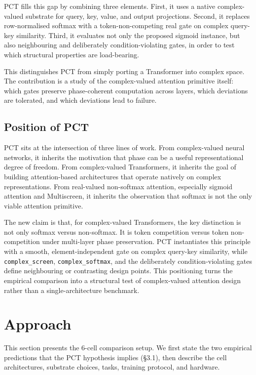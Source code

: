\documentclass[11pt,a4paper]{article}
\theoremstyle{plain}
\theoremstyle{definition}
\begin{document}
PCT fills this gap by combining three elements. First, it uses a native complex-valued substrate for query, key, value, and output projections. Second, it replaces row-normalised softmax with a token-non-competing real gate on complex query-key similarity. Third, it evaluates not only the proposed sigmoid instance, but also neighbouring and deliberately condition-violating gates, in order to test which structural properties are load-bearing.

This distinguishes PCT from simply porting a Transformer into complex space. The contribution is a study of the complex-valued attention primitive itself: which gates preserve phase-coherent computation across layers, which deviations are tolerated, and which deviations lead to failure.

\subsection{Position of PCT}
PCT sits at the intersection of three lines of work. From complex-valued neural networks, it inherits the motivation that phase can be a useful representational degree of freedom. From complex-valued Transformers, it inherits the goal of building attention-based architectures that operate natively on complex representations. From real-valued non-softmax attention, especially sigmoid attention and Multiscreen, it inherits the observation that softmax is not the only viable attention primitive.

The new claim is that, for complex-valued Transformers, the key distinction is not only softmax versus non-softmax. It is token competition versus token non-competition under multi-layer phase preservation. PCT instantiates this principle with a smooth, element-independent gate on complex query-key similarity, while \texttt{complex\_screen}, \texttt{complex\_softmax}, and the deliberately condition-violating gates define neighbouring or contrasting design points. This positioning turns the empirical comparison into a structural test of complex-valued attention design rather than a single-architecture benchmark.

\medskip

\section{Approach}
This section presents the 6-cell comparison setup. We first state the two empirical predictions that the PCT hypothesis implies (\S{}3.1), then describe the cell architectures, substrate choices, tasks, training protocol, and hardware.
\end{document}
